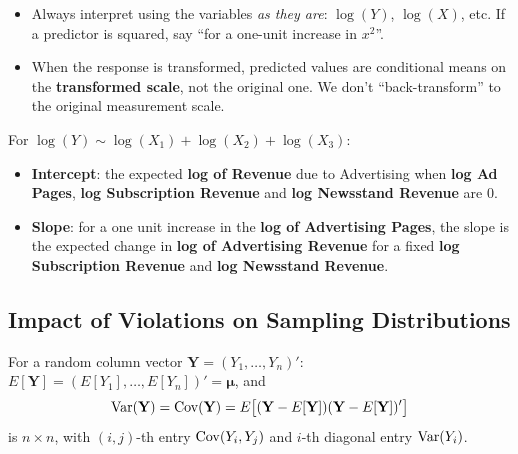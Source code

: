 \begin{remark}
    \begin{itemize}
        \item Always interpret using the variables \emph{as they are}: $\log(Y)$, $\log(X)$, etc.
        If a predictor is squared, say ``for a one-unit increase in $x^2$''.
        \item When the response is transformed, predicted values are conditional means
        on the \textbf{transformed scale}, not the original one. We don't
        ``back-transform'' to the original measurement scale.
    \end{itemize}
\end{remark}

\begin{example}
    For $\log(Y)\sim\log(X_1)+\log(X_2)+\log(X_3)$:
    \begin{itemize}
        \item \textbf{Intercept}: the expected \textbf{log of Revenue} due to Advertising when
        \textbf{log Ad Pages}, \textbf{log Subscription Revenue} and \textbf{log Newsstand Revenue} are 0.
        \item \textbf{Slope}: for a one unit increase in the \textbf{log of Advertising Pages},
        the slope is the expected change in \textbf{log of Advertising Revenue} for a fixed
        \textbf{log Subscription Revenue} and \textbf{log Newsstand Revenue}.
    \end{itemize}
\end{example}

\subsection{Impact of Violations on Sampling Distributions}

\begin{remark}
    For a random column vector $\mathbf{Y}=(Y_1,\dots,Y_n)'$:
    $E[\mathbf{Y}]=(E[Y_1],\dots,E[Y_n])'=\boldsymbol\mu$, and
    \[\operatorname{Var}(\mathbf{Y})=\operatorname{Cov}(\mathbf{Y})=E\big[(\mathbf{Y}-E[\mathbf{Y}])(\mathbf{Y}-E[\mathbf{Y}])'\big]\]
    is $n\times n$, with $(i,j)$-th entry $\operatorname{Cov}(Y_i,Y_j)$ and $i$-th diagonal entry $\operatorname{Var}(Y_i)$.
\end{remark}

